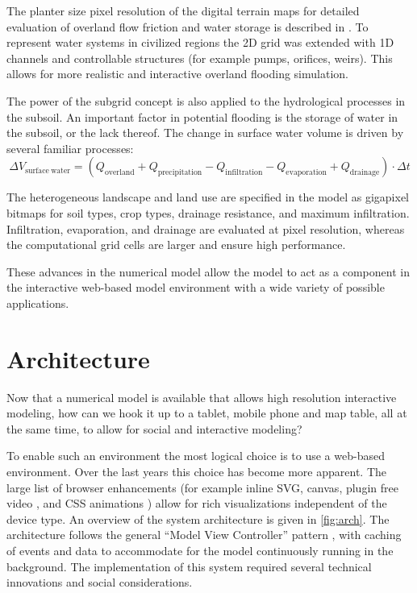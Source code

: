 \documentclass[a4paper]{article}
\begin{document}
The planter size pixel resolution of the digital terrain maps for detailed evaluation of overland flow friction and water storage is described in \citet{Stelling2012}. To represent water systems in civilized regions the 2D grid was extended with 1D channels and controllable structures (for example pumps, orifices, weirs). This allows for more realistic and interactive overland flooding simulation.

The power of the subgrid concept is also applied to the hydrological processes in the subsoil. An important factor in potential flooding is the storage of water in the subsoil, or the lack thereof. The change in surface water volume is driven by several familiar processes:
\[
\Delta V_\mathrm{surface\ water} = (Q_\mathrm{overland} + Q_\mathrm{precipitation} - Q_\mathrm{infiltration} - Q_\mathrm{evaporation} + Q_\mathrm{drainage})\cdot\Delta t
\]

The heterogeneous landscape and land use are specified in the model as gigapixel bitmaps for soil types, crop types, drainage resistance, and maximum infiltration.  Infiltration, evaporation, and drainage are evaluated at pixel resolution, whereas the computational grid cells are larger and ensure high performance.

These advances in the numerical model allow the model to act as a component in the interactive web-based model environment with a wide variety of possible applications.


\section{Architecture}
Now that a numerical model is available that allows high resolution interactive modeling, how can we hook it up to a tablet, mobile phone and map table, all at the same time, to allow for social and interactive modeling?

To enable such an environment the most logical choice is to use a web-based environment. Over the last years this choice has become more apparent. The large list of browser enhancements (for example inline \ac{SVG}, canvas, plugin free video \citep{Berjon2014}, and \ac{CSS} animations \citep{Jackson2013}) allow for rich visualizations independent of the device type. An overview of the system architecture is given in \autoref{fig:arch}. The architecture follows the general ``Model View Controller'' pattern \citep{Gamma1994}, with caching of events and data to accommodate for the model continuously running in the background. The implementation of this system required several technical innovations and social considerations.
\end{document}
